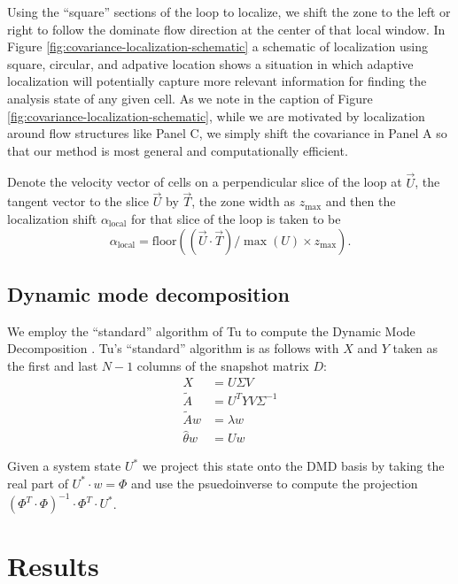 Using the ``square'' sections of the loop to localize, we shift the zone to the left or right to follow the dominate flow direction at the center of that local window.
In Figure \ref{fig:covariance-localization-schematic} a schematic of localization using square, circular, and adpative location shows a situation in which adaptive localization will potentially capture more relevant information for finding the analysis state of any given cell.
As we note in the caption of Figure \ref{fig:covariance-localization-schematic}, while we are motivated by localization around flow structures like Panel C, we simply shift the covariance in Panel A so that our method is most general and computationally efficient.

Denote the velocity vector of cells on a perpendicular slice of the loop at $\vec{U}$, the tangent vector to the slice $\vec{U}$ by $\vec{T}$, the zone width as $z_{\text{max}}$ and then the localization shift $\alpha_{\text{local}}$ for that slice of the loop is taken to be
\begin{equation} \alpha_{\text{local}} = \text{floor} \left( (\vec{U} \cdot \vec{T})/\max (U) \times z_{\text{max}} \right) . \end{equation}

\subsection{Dynamic mode decomposition}

We employ the ``standard'' algorithm of Tu to compute the Dynamic Mode Decomposition \cite{tu2013dynamic}.
Tu's ``standard'' algorithm is as follows with $X$ and $Y$ taken as the first and last $N-1$ columns of the snapshot matrix $D$:
\begin{align*} X &= U\Sigma V \tag*{(Take SVD of $X$.)}\\
  \tilde{A} &= U^T Y V \Sigma ^{-1} \tag*{(Build the $A$ matrix.)}\\
  \tilde{A}w &= \lambda w \tag*{(Compute eigenvectors and values.)}\\
  \hat{\theta}w &= U w \tag*{(Compute corresponding modes.)}\end{align*}

Given a system state $U^*$ we project this state onto the DMD basis by taking the real part of $U^*\cdot w = \Phi$ and use the psuedoinverse to compute the projection $(\Phi^T \cdot \Phi)^{-1} \cdot \Phi ^T \cdot U^*$.

\section{Results}

